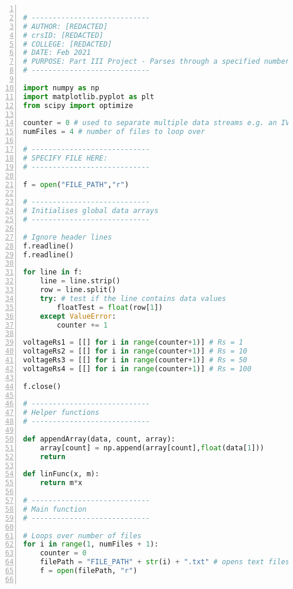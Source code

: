 \begin{lstlisting}[language=Python, basicstyle=\footnotesize, numbers=left, numberstyle=\tiny, breaklines=true, commentstyle=\itshape\color{magenta}, keywordstyle=\bfseries\color{blue}, identifierstyle=\color{cyan}, stringstyle=\color{red}, showstringspaces=false]

# ----------------------------
# AUTHOR: [REDACTED]
# crsID: [REDACTED]
# COLLEGE: [REDACTED]
# DATE: Feb 2021
# PURPOSE: Part III Project - Parses through a specified number of files and performs a linear regression of the data in each file.
# ----------------------------

import numpy as np
import matplotlib.pyplot as plt
from scipy import optimize

counter = 0 # used to separate multiple data streams e.g. an IV graph with different resistance values
numFiles = 4 # number of files to loop over

# ----------------------------
# SPECIFY FILE HERE:
# ----------------------------

f = open("FILE_PATH","r")

# ----------------------------
# Initialises global data arrays
# ----------------------------

# Ignore header lines
f.readline()
f.readline()

for line in f:
    line = line.strip()
    row = line.split()
    try: # test if the line contains data values
        floatTest = float(row[1])
    except ValueError:
        counter += 1

voltageRs1 = [[] for i in range(counter+1)] # Rs = 1
voltageRs2 = [[] for i in range(counter+1)] # Rs = 10
voltageRs3 = [[] for i in range(counter+1)] # Rs = 50
voltageRs4 = [[] for i in range(counter+1)] # Rs = 100

f.close()

# ----------------------------
# Helper functions
# ----------------------------

def appendArray(data, count, array):
    array[count] = np.append(array[count],float(data[1]))
    return

def linFunc(x, m):
    return m*x

# ----------------------------
# Main function
# ----------------------------

# Loops over number of files
for i in range(1, numFiles + 1):
    counter = 0
    filePath = "FILE_PATH" + str(i) + ".txt" # opens text files named xxx1.txt, xxx2.txt, ...
    f = open(filePath, "r")


\end{lstlisting}
